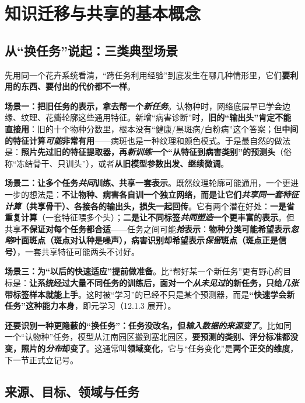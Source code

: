 \section{知识迁移与共享的基本概念}
\label{sec:kts-overview-concepts}

\subsection{从“换任务”说起：三类典型场景}

先用同一个花卉系统看清，“跨任务利用经验”到底发生在哪几种情形里，它们\textbf{要利用的东西、要付出的代价都不一样}。

\textbf{场景一：把旧任务的表示，拿去帮一个\emph{新任务}}。认物种时，网络底层早已学会边缘、纹理、花瓣轮廓这些通用特征。新增“病害诊断”时，\textbf{旧的“输出头”肯定不能直接用}：旧的十个物种分数里，根本没有“健康/黑斑病/白粉病”这个答案；但\textbf{中间的特征计算\emph{可能}非常有用}——病斑也是一种纹理和颜色模式。于是最自然的做法是：\textbf{照片先过旧的特征提取器，再\emph{新训练}一个“从特征到病害类别”的预测头}（俗称“冻结骨干、只训头”），或者\textbf{从旧模型参数出发、继续微调}。

\textbf{场景二：让多个任务\emph{共同}训练、共享一套表示}。既然纹理轮廓可能通用，一个更进一步的想法是：\textbf{不让物种、病害各自训一个独立网络，而是让它们\emph{共享同一套特征计算}（共享骨干）、各接各的输出头，损失一起回传}。它有两个潜在好处：\textbf{一是省重复计算}（一套特征喂多个头）；\textbf{二是让不同标签\emph{共同塑造}一个更丰富的表示}。但共享\textbf{不保证对每个任务都合适}——任务之间可能\textbf{\emph{抢}表示}：\textbf{物种分类可能希望表示\emph{忽略}叶面斑点（斑点对认种是噪声），病害识别却希望表示\emph{保留}斑点（斑点正是信号）}，一套共享特征可能两头不讨好。

\textbf{场景三：为“以后的快速适应”提前做准备}。比“帮好某一个新任务”更有野心的目标是：\textbf{让系统经过大量不同任务的训练后，面对一个\emph{从未见过}的新任务，只给\emph{几张}带标签样本就能上手}。这时被“学习”的已经不只是某个预测器，而是\textbf{“快速学会新任务”这种能力本身}，即元学习（12.1.3 展开）。

\textbf{还要识别一种更隐蔽的“换任务”：任务没改名，但\emph{输入数据的来源变了}}。比如同一个“认物种”任务，模型从江南园区搬到塞北园区，\textbf{要预测的类别、评分标准都没变，照片的\emph{分布}却变了}。这通常叫\textbf{领域变化}，它与“任务变化”是\textbf{两个正交的维度}，下一节正式立记号。

\subsection{来源、目标、领域与任务}
\label{sec:kts-overview-source-target}

